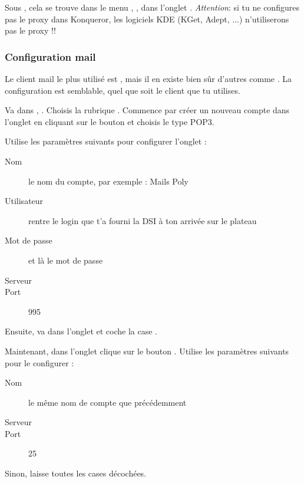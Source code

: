 Sous , cela se trouve dans le menu , ,
dans l'onglet . \emph{Attention}: si tu ne configures pas le proxy dans Konqueror,
les logiciels KDE (KGet, Adept, ...) n'utiliserons pas le proxy !!




\subsubsection{Configuration mail}

 Le client mail le plus
utilisé est , mais il en existe bien sûr d'autres comme
. La configuration est semblable, quel que soit le
client que tu utilises.

Va dans , . Choisis la
rubrique . Commence par créer un nouveau compte dans
l'onglet  en cliquant sur le bouton
 et choisis le type POP3.


Utilise les paramètres suivants pour configurer l'onglet
 :
\begin{description}
  \item[Nom] le nom du compte, par exemple : Mails Poly
  \item[Utilisateur] rentre le login  que t'a fourni la DSI à ton arrivée sur le plateau
  \item[Mot de passe] et là le mot de passe 
  \item[Serveur] 
  \item[Port] 995
\end{description}

Ensuite, va dans l'onglet  et coche la case
.


Maintenant, dans l'onglet  clique sur le
bouton . Utilise les paramètres suivants pour le
configurer :
\begin{description}
  \item[Nom] le m\^eme nom de compte que précédemment
  \item[Serveur] 
  \item[Port] 25
\end{description}
Sinon, laisse toutes les cases décochées.

